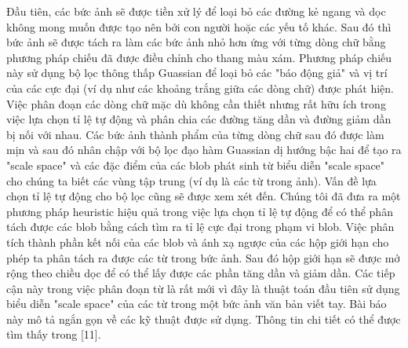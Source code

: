 \documentclass[a4paper]{article}
\begin{document}
Đầu tiên, các bức ảnh sẽ được tiền xử lý để loại bỏ các đường kẻ ngang và dọc không mong muốn được tạo nên bởi con người hoặc các yếu tố khác. Sau đó thì bức ảnh sẽ được tách ra làm các bức ảnh nhỏ hơn ứng với từng dòng chữ bằng phương pháp chiếu đã được điều chỉnh cho thang màu xám. Phương pháp chiếu này sử dụng bộ lọc thông thấp Guassian để loại bỏ các "báo động giả" và vị trí của các cực đại (ví dụ như các khoảng trắng giữa các dòng chữ) được phát hiện. Việc phân đoạn các dòng chữ mặc dù không cần thiết nhưng rất hữu ích trong việc lựa chọn tỉ lệ tự động và phân chia các đường tăng dần và đường giảm dần bị nối với nhau. Các bức ảnh thành phẩm của từng dòng chữ sau đó được làm mịn và sau đó nhân chập với bộ lọc đạo hàm Guassian dị hướng bậc hai để tạo ra "scale space" và các đặc điểm của các blob phát sinh từ biểu diễn "scale space" cho chúng ta biết các vùng tập trung (ví dụ là các từ trong ảnh). Vấn đề lựa chọn tỉ lệ tự động cho bộ lọc cũng sẽ được xem xét đến. Chúng tôi đã đưa ra một phương pháp heuristic hiệu quả trong việc lựa chọn tỉ lệ tự động để có thể phân tách được các blob bằng cách tìm ra tỉ lệ cực đại trong phạm vi blob. Việc phân tích thành phần kết nối của các blob và ánh xạ ngược của các hộp giới hạn cho phép ta phân tách ra được các từ trong bức ảnh. Sau đó hộp giới hạn sẽ được mở rộng theo chiều dọc để có thể lấy được các phần tăng dần và giảm dần. Các tiếp cận này trong việc phân đoạn từ là rất mới vì đây là thuật toán đầu tiên sử dụng biểu diễn "scale space" của các từ trong một bức ảnh văn bản viết tay. Bài báo này mô tả ngắn gọn về các kỹ thuật được sử dụng. Thông tin chi tiết có thể được tìm thấy trong [11].
\end{document}

